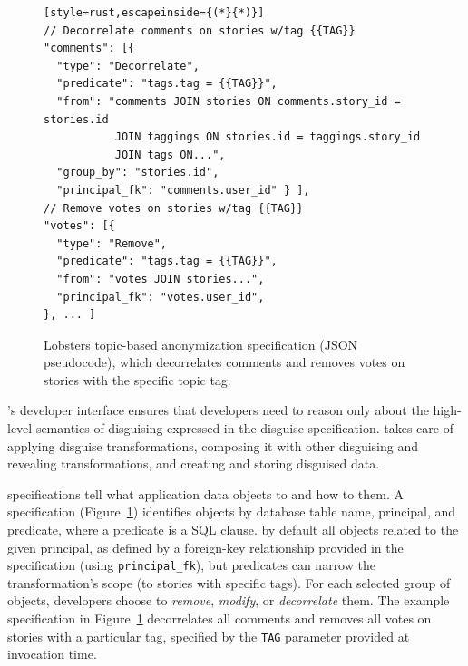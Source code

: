 \begin{figure}[t]
\centering
\begin{lstlisting}[style=rust,escapeinside={(*}{*)}]
// Decorrelate comments on stories w/tag {{TAG}}
"comments": [{
  "type": "Decorrelate",
  "predicate": "tags.tag = {{TAG}}",
  "from": "comments JOIN stories ON comments.story_id = stories.id
           JOIN taggings ON stories.id = taggings.story_id
           JOIN tags ON...",
  "group_by": "stories.id",
  "principal_fk": "comments.user_id" } ],
// Remove votes on stories w/tag {{TAG}}
"votes": [{
  "type": "Remove",
  "predicate": "tags.tag = {{TAG}}",
  "from": "votes JOIN stories...",
  "principal_fk": "votes.user_id",
}, ... ]
\end{lstlisting}
    \caption[Lobsters topic-based anonymization disguise specification.]{Lobsters topic-based anonymization \xx specification (JSON
    pseudocode), which decorrelates comments and removes votes on stories with
    the specific topic tag.}
\label{f:spec}
\end{figure}


\sys's developer interface ensures that developers need to reason only
about the high-level semantics of disguising expressed in the disguise
specification. \sys takes care of applying disguise transformations, composing
it with other disguising and revealing transformations, and creating and storing
disguised data.


\Xx specifications tell \sys what application data objects to \xx and how to \xx them.
%
A \xx specification (Figure~\ref{f:spec}) identifies objects by database table name, principal, and
predicate, where a predicate is a SQL  clause.
%
\sys by default \xxs all objects related to the given principal, as defined by
a foreign-key relationship provided in the \xx specification (using
\texttt{principal\_fk}), but predicates can narrow the transformation's scope
(\eg to stories with specific tags).
%
For each selected group of objects, developers choose to
\emph{remove}, \emph{modify}, or \emph{decorrelate} them.
%
The example specification in Figure~\ref{f:spec} decorrelates all comments and removes all
votes on stories with a particular tag, specified by the \texttt{TAG} parameter provided
at invocation time.
%
%


